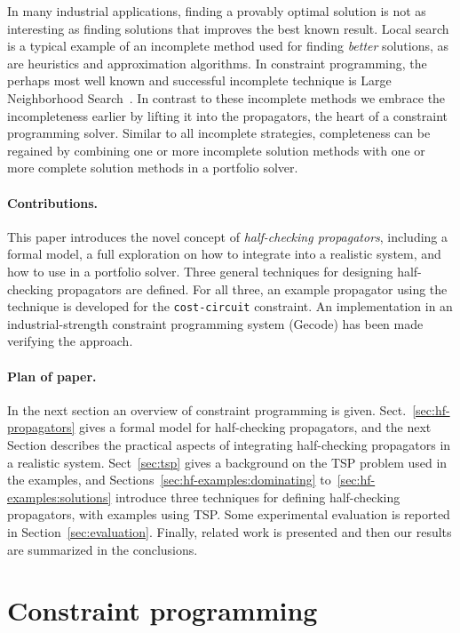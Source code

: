 \documentclass[runningheads]{llncs}
\newcommand{\cons}[1]{\texttt{#1}}
\begin{document}
In many industrial applications, finding a provably optimal solution
is not as interesting as finding solutions that improves the best
known result.  Local search is a typical example of an incomplete
method used for finding \emph{better} solutions, as are heuristics
and approximation algorithms.  In constraint programming, the perhaps
most well known and successful incomplete technique is
Large Neighborhood Search~\cite{lns}. In contrast to these incomplete
methods we embrace the incompleteness earlier by lifting it into the
propagators, the heart of a constraint programming solver. Similar to
all incomplete strategies, completeness can be regained by combining
one or more incomplete solution methods with one or more complete
solution methods in a portfolio solver.

 
\paragraph{Contributions.} This paper introduces the novel concept of
\emph{half-checking propagators}, including a formal model, a full
exploration on how to integrate into a realistic system, and how to
use in a portfolio solver. Three general techniques for designing
half-checking propagators are defined. For all three, an example
propagator using the technique is developed for the
\cons{cost-circuit} constraint. An implementation in an
industrial-strength constraint programming system (Gecode) has been
made verifying the approach. 

\paragraph{Plan of paper.} In the next section an overview of
constraint programming is given. Sect.~\ref{sec:hf-propagators} gives
a formal model for half-checking propagators, and the next Section
describes the practical aspects of integrating half-checking
propagators in a realistic system. Sect~\ref{sec:tsp} gives a
background on the TSP problem used in the examples, and
Sections~\ref{sec:hf-examples:dominating}
to~\ref{sec:hf-examples:solutions} introduce three techniques for
defining half-checking propagators, with examples using TSP. Some
experimental evaluation is reported in
Section~\ref{sec:evaluation}. Finally, related work is presented and
then our results are summarized in the conclusions.

\section{Constraint programming}
\label{sec:cp}
\end{document}
